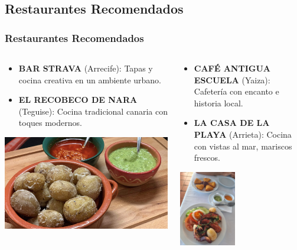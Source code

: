 \documentclass{beamer}
\begin{document}
	
	\begin{frame}
		
		\section{Restaurantes Recomendados}
		\frametitle{Restaurantes Recomendados}
		
		\begin{columns}[c]
			\begin{column}{0.5\textwidth}
				\begin{itemize}
					\item \textbf{BAR STRAVA} (Arrecife): Tapas y cocina creativa en un ambiente urbano.
					\item \textbf{EL RECOBECO DE NARA} (Teguise): Cocina tradicional canaria con toques modernos.
					
				\end{itemize}
				\centering
				\includegraphics[width=1\textwidth]{papas}
				\label{fig:papas}
			\end{column}
			\begin{column}{0.5\textwidth}
				\begin{itemize}
					\item \textbf{CAFÉ ANTIGUA ESCUELA} (Yaiza): Cafetería con encanto e historia local.
					\item \textbf{LA CASA DE LA PLAYA} (Arrieta): Cocina con vistas al mar, mariscos frescos.
					
				\end{itemize}
				\centering
				\includegraphics[angle=270, width=0.45\textwidth]{casa}
				\label{fig:casa}
			\end{column}
		\end{columns}
		

\end{frame}
\end{document}

